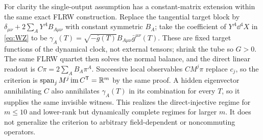 For clarity the single-output assumption has a constant-matrix extension within the same exact FLRW construction. Replace the tangential target block by \(\delta_{\mu\nu}+2\sum_A Y^A B_{A\mu\nu}\) with constant symmetric \(B_A\); take the coefficient of \(Y^A\dd^4X\) in \eqref{eq:WZ} to be
\(\gamma_A(T)=\sqrt{-\bar g(T)}B_{A\mu\nu}\bar g^{\mu\nu}(T)\).
These are fixed target functions of the dynamical clock, not external tensors; shrink the tube so \(G>0\). The same FLRW quartet then solves the normal balance, and the direct linear readout is \(C\pi=2\sum_A B_A\pi^A\). Successive local observables \(CM^j\pi\) replace \(c_j\), so the criterion is \(\operatorname{span}_j M^j\operatorname{im}C^{\mathsf T}=\mathbb R^m\) by the same proof. A hidden eigenvector annihilating \(C\) also annihilates \(\gamma_A(T)\) in its combination for every \(T\), so it supplies the same invisible witness. This realizes the direct-injective regime for \(m\le10\) and lower-rank but dynamically complete regimes for larger \(m\). It does not generalize the criterion to arbitrary field-dependent or noncommuting operators.

